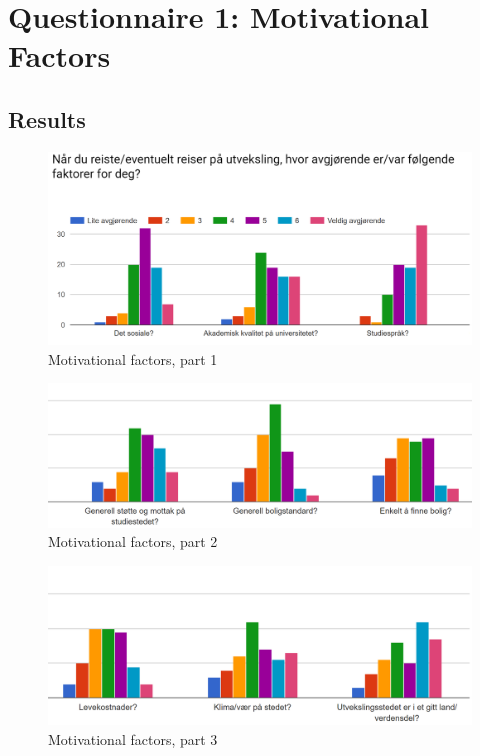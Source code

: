 \chapter{Questionnaire 1: Motivational Factors}
\label{app:questionnaire1}

\section{Results}

\begin{figure}[h]
    \centering
    \includegraphics[width=1\textwidth]{fig/form1/results/slide1.PNG}
    \caption[]{Motivational factors, part 1}
    \label{fig:app_motivational_p1}
\end{figure}

\begin{figure}[h]
    \centering
    \includegraphics[width=1\textwidth]{fig/form1/results/slide2.PNG}
    \caption[]{Motivational factors, part 2}
    \label{fig:app_motivational_p2}
\end{figure}

\begin{figure}[h]
    \centering
    \includegraphics[width=1\textwidth]{fig/form1/results/slide3.PNG}
    \caption[]{Motivational factors, part 3}
    \label{fig:app_motivational_p3}
\end{figure}


